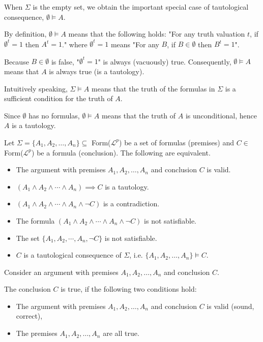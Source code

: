 \documentclass{article}
\begin{document}
When $\Sigma$ is the empty set, we obtain the important special case of tautological consequence, $\emptyset \vDash A$. 

By definition, $\emptyset \vDash A$ means that the following holds: "For any truth valuation $t$, if $\emptyset^t = 1$ then $A^t = 1$." where $\emptyset^t = 1$ means "For any $B$, if $B \in \emptyset$ then $B^t = 1$". 

Because $B \in \emptyset$ is false, "$\emptyset^t = 1$" is always (vacuously) true. Consequently, $\emptyset \vDash A$ means that $A$ is always true (is a tautology). 

Intuitively speaking, $\Sigma \vDash A$ means that the truth of the formulas in $\Sigma$ is a sufficient condition for the truth of $A$. 

Since $\emptyset$ has no formulas, $\emptyset \vDash A$ means that the truth of $A$ is unconditional, hence $A$ is a tautology. 

Let $\Sigma = \{A_1, A_2, \ldots, A_n\} \subseteq$ Form($\mathcal{L}^p$) be a set of formulas (premises) and $C \in $ Form($\mathcal{L}^p$) be a formula (conclusion). The following are equivalent. 
\begin{center}
\begin{itemize}
    \item The argument with premises $A_1, A_2, \ldots, A_n$ and conclusion $C$ is valid. 
    \item $(A_1 \wedge A_2 \wedge \cdots \wedge A_n) \implies C$ is a tautology.
    \item $(A_1 \wedge A_2 \wedge \cdots \wedge A_n \wedge \neg C)$ is a contradiction.
    \item The formula $(A_1 \wedge A_2 \wedge \cdots \wedge A_n \wedge \neg C)$ is not satisfiable.
    \item The set $\{A_1, A_2,\cdots,A_n,\neg C\}$ is not satisfiable.
    \item $C$ is a tautological consequence of $\Sigma$, i.e. $\{A_1, A_2, \ldots, A_n\} \vDash C$.
\end{itemize}
\end{center}

Consider an argument with premises $A_1, A_2, \ldots, A_n$ and conclusion $C$. 

The conclusion $C$ is true, if the following two conditions hold:
\begin{itemize}
    \item The argument with premises $A_1, A_2, \ldots, A_n$ and conclusion $C$ is valid (sound, correct),
    \item The premises $A_1, A_2, \ldots, A_n$ are all true.
\end{itemize}
\end{document}
